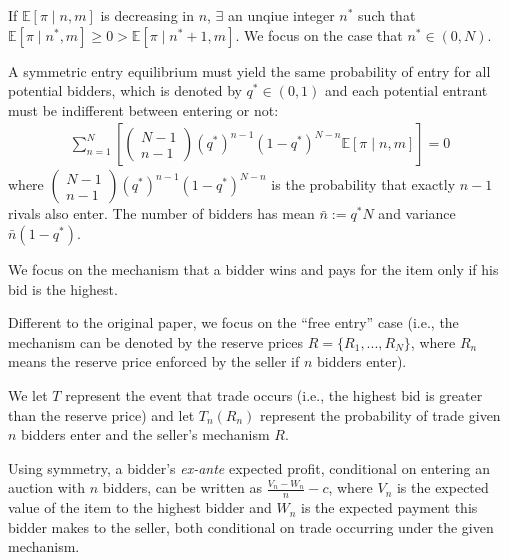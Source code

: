 \documentclass[11pt]{elegantbook}
\begin{document}
If $\mathbb{E}[\pi\mid n,m]$ is decreasing in $n$, $\exists$ an unqiue integer $n^*$ such that $\mathbb{E}[\pi\mid n^*,m]\geq 0>\mathbb{E}[\pi\mid n^*+1,m]$. We focus on the case that $n^*\in (0,N)$.

A symmetric entry equilibrium must yield the same probability of entry for all potential bidders, which is denoted by $q^*\in (0,1)$ and each potential entrant must be indifferent between entering or not:
\begin{equation}
    \begin{aligned}
        \sum_{n=1}^N\left[
            \begin{pmatrix}
            N-1\\
            n-1
        \end{pmatrix}
        (q^*)^{n-1}(1-q^*)^{N-n}\mathbb{E}[\pi\mid n,m]
        \right]=0
    \end{aligned}
    \label{EAE_1}
\end{equation}
where $\begin{pmatrix}N-1\\n-1\end{pmatrix}(q^*)^{n-1}(1-q^*)^{N-n}$ is the probability that exactly $n-1$ rivals also enter. The number of bidders has mean $\bar{n}:=q^*N$ and variance $\bar{n}(1-q^*)$.

We focus on the mechanism that a bidder wins and pays for the item only if his bid is the highest.
\begin{note}
    Different to the original paper, we focus on the ``free entry'' case (i.e., the mechanism can be denoted by the reserve prices $R=\{R_1,...,R_N\}$, where $R_n$ means the reserve price enforced by the seller if $n$ bidders enter).
\end{note}
We let $T$ represent the event that trade occurs (i.e., the highest bid is greater than the reserve price) and let $T_n(R_n)$ represent the probability of trade given $n$ bidders enter and the seller's mechanism $R$.

Using symmetry, a bidder's \textit{ex-ante} expected profit, conditional on entering an auction with $n$ bidders, can be written as $\frac{V_n-W_n}{n}-c$, where $V_n$ is the expected value of the item to the highest bidder and $W_n$ is the expected payment this bidder makes to the seller, both conditional on trade occurring under the given mechanism.
\end{document}
